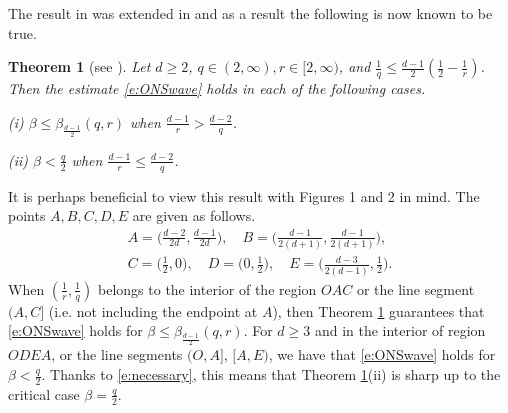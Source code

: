 \documentclass[a4paper]{amsart}
\numberwithin{equation}{section}%
\theoremstyle{plain}%
\newtheorem{theorem}{Theorem}[section]
\theoremstyle{definition}
\theoremstyle{remark}%
\begin{document}
The result in \cite{FS_AJM} was extended in \cite{BLN_Forum} and as a result the following is now known to be true.
\begin{theorem}[see \cite{BLN_Forum, FS_AJM}]  \label{t:mainknown}
Let $d \geq 2$, $q \in (2,\infty), r \in [2,\infty)$, and $\frac{1}{q} \leq \frac{d-1}{2}(\frac{1}{2} - \frac{1}{r})$. Then the estimate \eqref{e:ONSwave} holds in each of the following cases.

\emph{(i)} $\beta \leq \beta_{\frac{d-1}{2}}(q,r)$ when $\frac{d-1}{r} > \frac{d-2}{q}$.

\emph{(ii)} $\beta < \frac{q}{2}$ when $\frac{d-1}{r} \leq \frac{d-2}{q}$.\end{theorem} 
It is perhaps beneficial to view this result with Figures 1 and 2 in mind. The points $A, B, C, D, E$ are given as follows.
\begin{align*}
A = \bigg(\frac{d-2}{2d}, \frac{d-1}{2d}\bigg), \quad 
B  = \bigg(\frac{d-1}{2(d+1)},\frac{d-1}{2(d+1)}\bigg), \\
C = \bigg(\frac{1}{2},0\bigg), \quad D = \bigg(0,\frac{1}{2}\bigg), \quad E = \bigg(\frac{d-3}{2(d-1)},\frac{1}{2}\bigg).
\end{align*}
When $(\frac{1}{r},\frac{1}{q})$ belongs to the interior of the region $OAC$ or the line segment $(A,C]$ (i.e. not including the endpoint at $A$), then Theorem \ref{t:mainknown} guarantees that \eqref{e:ONSwave} holds for $\beta \leq \beta_{\frac{d-1}{2}}(q,r)$. For $d \geq 3$ and in the interior of region $ODEA$, or the line segments $(O,A]$, $[A,E)$, we have that \eqref{e:ONSwave} holds for $\beta < \frac{q}{2}$. Thanks to \eqref{e:necessary}, this means that Theorem \ref{t:mainknown}(ii) is sharp up to the critical case $\beta = \frac{q}{2}$. 
\end{document}
